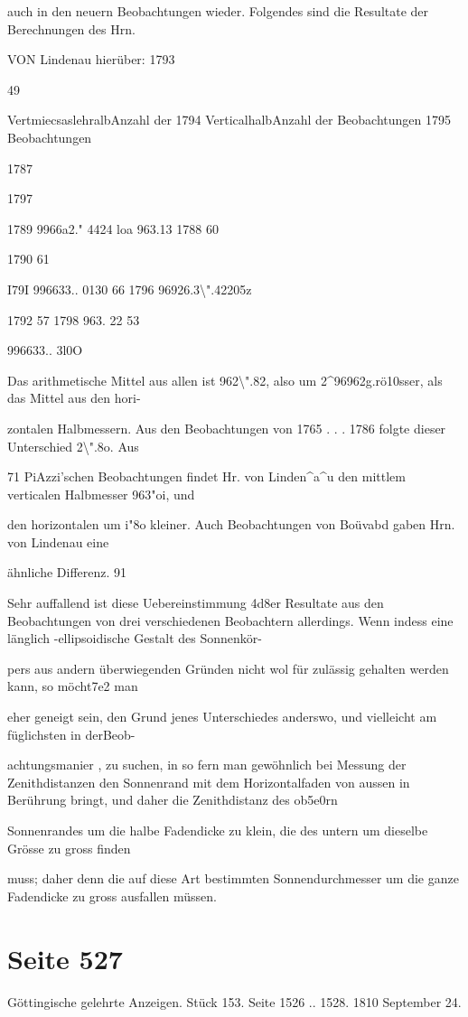 \documentclass[10pt,a4paper]{article}
\begin{document}
auch in den neuern Beobachtungen wieder. Folgendes sind die Resultate der Berechnungen des Hrn.

VON Lindenau hierüber: 1793

49

VertmiecsaslehralbAnzahl der 1794 VerticalhalbAnzahl der Beobachtungen 1795 Beobachtungen

1787

1797

1789 9966a2." 4424 loa 963.13 1788 60

1790 61

I79I 996633.. 0130 66 1796 96926.3\textbackslash{}".42205z

1792 57 1798 963. 22 53

996633.. 3l0O

Das arithmetische Mittel aus allen ist 962\textbackslash{}".82, also um 2\textasciicircum{}96962g.rö10sser, als das Mittel aus den hori-

zontalen Halbmessern. Aus den Beobachtungen von 1765 . . . 1786 folgte dieser Unterschied 2\textbackslash{}".8o. Aus

71 PiAzzi'schen Beobachtungen findet Hr. von Linden\textasciicircum{}a\textasciicircum{}u den mittlem verticalen Halbmesser 963"oi, und

den horizontalen um i"8o kleiner. Auch Beobachtungen von Boüvabd gaben Hrn. von Lindenau eine

ähnliche Differenz. 91

Sehr auffallend ist diese Uebereinstimmung 4d8er Resultate aus den Beobachtungen von drei verschiedenen Beobachtern allerdings. Wenn indess eine länglich -ellipsoidische Gestalt des Sonnenkör-

pers aus andern überwiegenden Gründen nicht wol für zulässig gehalten werden kann, so möcht7e2 man

eher geneigt sein, den Grund jenes Unterschiedes anderswo, und vielleicht am füglichsten in derBeob-

achtungsmanier , zu suchen, in so fern man gewöhnlich bei Messung der Zenithdistanzen den Sonnenrand mit dem Horizontalfaden von aussen in Berührung bringt, und daher die Zenithdistanz des ob5e0rn

Sonnenrandes um die halbe Fadendicke zu klein, die des untern um dieselbe Grösse zu gross finden

muss; daher denn die auf diese Art bestimmten Sonnendurchmesser um die ganze Fadendicke zu gross ausfallen müssen.


\newpage
\section*{Seite 527}
Göttingische gelehrte Anzeigen. Stück 153. Seite 1526 .. 1528. 1810 September 24.
\end{document}
